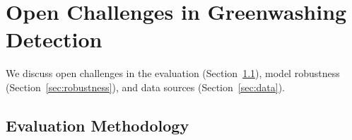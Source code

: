 \section{Open Challenges in Greenwashing Detection}
\label{sec:challenges}

We discuss open challenges in the evaluation (Section~\ref{sec:eval difficulty}), model robustness (Section~\ref{sec:robustness}), and data sources (Section~\ref{sec:data}).

\subsection{Evaluation Methodology}
\label{sec:eval difficulty}



